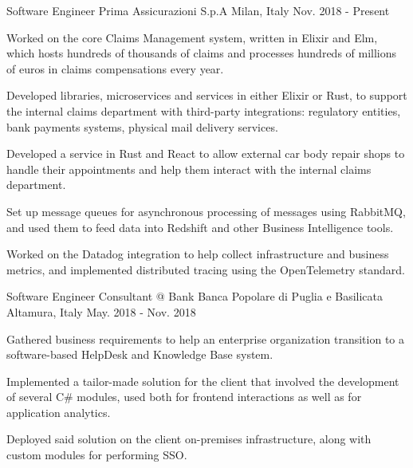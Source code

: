 

\begin{cventries}

  \cventry
    {Software Engineer} %
    {Prima Assicurazioni S.p.A} %
    {Milan, Italy} %
    {Nov. 2018 - Present} %
    {
      \begin{cvitems} %
        \item {Worked on the core Claims Management system, written in Elixir and Elm, which hosts hundreds of thousands of claims and processes hundreds of millions of euros in claims compensations every year.}
        \item {Developed libraries, microservices and services in either Elixir or Rust, to support the internal claims department with third-party integrations: regulatory entities, bank payments systems, physical mail delivery services.}
        \item {Developed a service in Rust and React to allow external car body repair shops to handle their appointments and help them interact with the internal claims department.}
        \item {Set up message queues for asynchronous processing of messages using RabbitMQ, and used them to feed data into Redshift and other Business Intelligence tools.}
        \item {Worked on the Datadog integration to help collect infrastructure and business metrics, and implemented distributed tracing using the OpenTelemetry standard.}
      \end{cvitems}
    }

  \cventry
    {Software Engineer Consultant @ Bank} %
    {Banca Popolare di Puglia e Basilicata} %
    {Altamura, Italy} %
    {May. 2018 - Nov. 2018} %
    {
      \begin{cvitems} %
        \item {Gathered business requirements to help an enterprise organization transition to a software-based HelpDesk and Knowledge Base system.}
        \item {Implemented a tailor-made solution for the client that involved the development of several C\# modules, used both for frontend interactions as well as for application analytics.}
        \item {Deployed said solution on the client on-premises infrastructure, along with custom modules for performing SSO.}
      \end{cvitems}
    }


\end{cventries}
